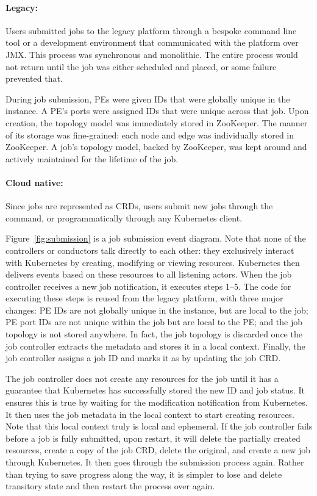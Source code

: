\paragraph{Legacy:} Users submitted jobs to the legacy platform through a
bespoke command line tool or a development environment that communicated with
the platform over JMX. This process was synchronous and monolithic. The entire
process would not return until the job was either scheduled and placed, or some
failure prevented that.

During job submission, PEs were given IDs that were globally unique in the
instance. A PE's ports were assigned IDs that were unique across that job.
Upon creation, the topology model was immediately stored in ZooKeeper. The
manner of its storage was fine-grained: each node and edge was individually
stored in ZooKeeper. A job's topology model, backed by ZooKeeper, was kept
around and actively maintained for the lifetime of the job.

\paragraph{Cloud native:} Since jobs are represented as CRDs, users submit new
jobs through the  command, or programmatically through any
Kubernetes client.

Figure~\ref{fig:submission} is a job submission event diagram. Note that none of
the controllers or conductors talk directly to each other: they exclusively
interact with Kubernetes by creating, modifying or viewing resources. Kubernetes
then delivers events based on these resources to all listening actors. When the
job controller receives a new job notification, it executes steps 1--5. The code
for executing these steps is reused from the legacy platform, with three major
changes: PE IDs are not globally unique in the instance, but are local to the
job; PE port IDs are not unique within the job but are local to the PE; and the
job topology is not stored anywhere. In fact, the job topology is
discarded once the job controller extracts the metadata and stores it in a local
context.  Finally, the job controller assigns a job ID and marks it as
 by updating the job CRD.

The job controller does not create any resources for the job until it has a
guarantee that Kubernetes has successfully stored the new ID and job status.  It
ensures this is true by waiting for the modification notification from
Kubernetes.  It then uses the job metadata in the local context to start
creating resources. Note that this local context truly is local and ephemeral.
If the job controller fails before a job is fully submitted, upon restart, it
will delete the partially created resources, create a copy of the job CRD,
delete the original, and create a new job through Kubernetes.  It then goes
through the submission process again. Rather than trying to save progress along
the way, it is simpler to lose and delete transitory state and then restart the
process over again.

